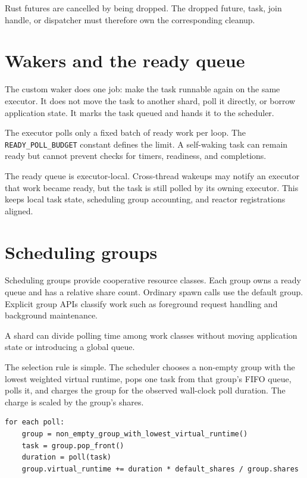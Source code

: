 \begin{notabene}
Rust futures are cancelled by being dropped. The dropped future, task, join
handle, or dispatcher must therefore own the corresponding cleanup.
\end{notabene}

\section{Wakers and the ready queue}

The custom waker does one job: make the task runnable again on the same
executor. It does not move the task to another shard, poll it directly, or
borrow application state. It marks the task queued and hands it to the
scheduler.

The executor polls only a fixed batch of ready work per loop. The
\texttt{READY\_POLL\_BUDGET} constant defines the limit. A self-waking task can
remain ready but cannot prevent checks for timers, readiness, and completions.

The ready queue is executor-local. Cross-thread wakeups may notify an executor
that work became ready, but the task is still polled by its owning executor.
This keeps local task state, scheduling group accounting, and reactor
registrations aligned.

\section{Scheduling groups}

Scheduling groups provide cooperative resource classes. Each group owns a
ready queue and has a relative share count. Ordinary spawn calls use the
default group. Explicit group APIs classify work such as foreground request
handling and background maintenance.

A shard can divide polling time among work classes without moving application
state or introducing a global queue.

The selection rule is simple. The scheduler chooses a non-empty group with the lowest weighted virtual runtime, pops one task from that
group's FIFO queue, polls it, and charges the group for the observed wall-clock
poll duration. The charge is scaled by the group's shares.

\begin{lstlisting}[language={},caption={Weighted group selection}]
for each poll:
    group = non_empty_group_with_lowest_virtual_runtime()
    task = group.pop_front()
    duration = poll(task)
    group.virtual_runtime += duration * default_shares / group.shares
\end{lstlisting}

